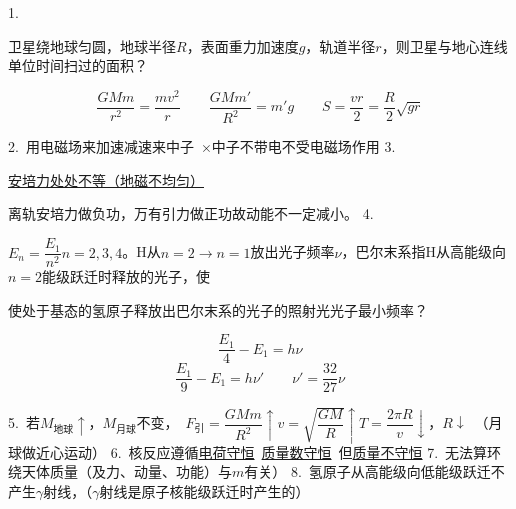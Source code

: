 1.
\begin{problem}
卫星绕地球匀圆，地球半径$R$，表面重力加速度$g$，轨道半径$r$，则卫星与地心连线单位时间扫过的面积？ %
\begin{solution}
\[
\frac{GMm}{r^2}=\frac{mv^2}{r}\qquad \frac{GMm'}{R^2}=m'g\qquad S=\frac{vr}{2}=\frac{R}{2}\sqrt{gr}
\]
\end{solution}
\end{problem}
2.\ 用电磁场来加速减速来中子\ $\times$\qquad 中子不带电不受电磁场作用 %
3.

\underline{安培力处处不等（地磁不均匀）} %

离轨\quad 安培力做负功，万有引力做正功\quad 故动能不一定减小。
4.
\begin{problem}
$E_n=\dfrac{E_1}{n^2}$\quad $n=2,3,4$。H从$n=2\to n=1$放出光子频率$\nu$，巴尔末系指H从高能级向$n=2$能级跃迁时释放的光子，使

使处于基态的氢原子释放出巴尔末系的光子的照射光光子最小频率？ %
\begin{solution}
\[
\frac{E_1}{4}-E_1=h\nu
\]
\[
\frac{E_1}{9}-E_1=h\nu'\qquad \nu'=\frac{32}{27}\nu
\]
\end{solution}
\end{problem}
5.\ 若$M_{\text{地球}}\uparrow$，$M_{\text{月球}}$不变，\ $F_{\text{引}}=\dfrac{GMm}{R^2}\uparrow$\quad $v=\sqrt{\dfrac{GM}{R}}\uparrow$\quad $T=\dfrac{2\pi R}{v}\downarrow$，$R\downarrow$\ （月球做近心运动） %
6.\ 核反应遵循\underline{电荷守恒}\ \underline{质量数守恒}\ 但\underline{质量不守恒}
7.\ 无法算环绕天体质量（及力、动量、功能）与$m$有关） %
8.\ 氢原子从高能级向低能级跃迁不产生$\gamma$射线，（$\gamma$射线是原子核能级跃迁时产生的）

